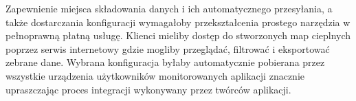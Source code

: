 Zapewnienie miejsca składowania danych i ich automatycznego przesyłania, a także dostarczania konfiguracji wymagałoby przekształcenia prostego narzędzia w pełnoprawną płatną usługę. Klienci mieliby dostęp do stworzonych map cieplnych poprzez serwis internetowy gdzie mogliby przeglądać, filtrować i eksportować zebrane dane. Wybrana konfiguracja byłaby automatycznie pobierana przez wszystkie urządzenia użytkowników monitorowanych aplikacji znacznie upraszczając proces integracji wykonywany przez twórców aplikacji.
